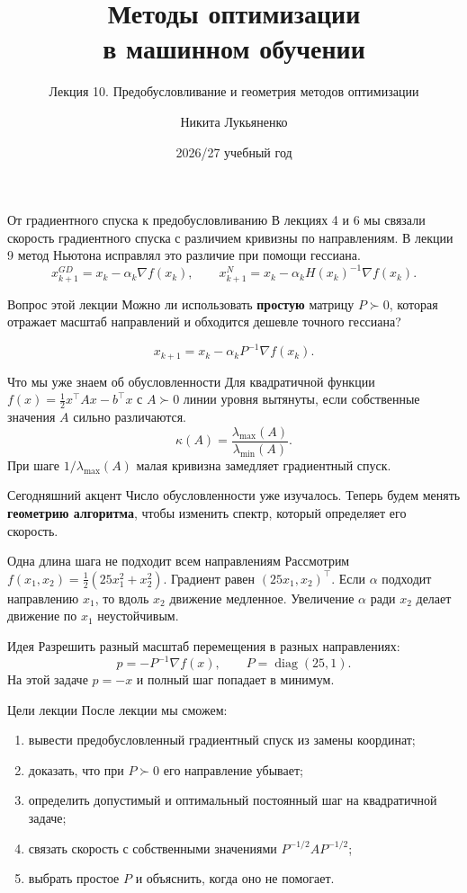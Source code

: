 \documentclass[aspectratio=169,10pt]{beamer}
\title[Методы оптимизации]{Методы оптимизации\\в машинном обучении}
\subtitle{Лекция 10. Предобусловливание и геометрия методов оптимизации}
\author[Н. Лукьяненко]{Никита Лукьяненко}
\institute{Совместная программа СМОЛ ГУ и ФКН НИУ ВШЭ}
\date{2026/27 учебный год}
\newcommand{\grad}{\nabla}
\begin{document}
\frame[plain]{\titlepage}

\begin{frame}{От градиентного спуска к предобусловливанию}
\small
В лекциях 4 и 6 мы связали скорость градиентного спуска с различием кривизны по направлениям. В лекции 9 метод Ньютона исправлял это различие при помощи гессиана.
\[
x_{k+1}^{GD}=x_k-\alpha_k\grad f(x_k),\qquad
x_{k+1}^{N}=x_k-\alpha_k H(x_k)^{-1}\grad f(x_k).
\]
\begin{block}{Вопрос этой лекции}
Можно ли использовать \textbf{простую} матрицу $P\succ0$, которая отражает масштаб направлений и обходится дешевле точного гессиана?
\end{block}
\[
\boxed{x_{k+1}=x_k-\alpha_kP^{-1}\grad f(x_k).}
\]
\end{frame}

\begin{frame}{Что мы уже знаем об обусловленности}
\small
Для квадратичной функции $f(x)=\tfrac12x^\top Ax-b^\top x$ с $A\succ0$ линии уровня вытянуты, если собственные значения $A$ сильно различаются.
\[
\kappa(A)=\frac{\lambda_{\max}(A)}{\lambda_{\min}(A)}.
\]
При шаге $1/\lambda_{\max}(A)$ малая кривизна замедляет градиентный спуск.
\begin{alertblock}{Сегодняшний акцент}
Число обусловленности уже изучалось. Теперь будем менять \textbf{геометрию алгоритма}, чтобы изменить спектр, который определяет его скорость.
\end{alertblock}
\end{frame}

\begin{frame}{Одна длина шага не подходит всем направлениям}
\small
Рассмотрим $f(x_1,x_2)=\tfrac12(25x_1^2+x_2^2)$. Градиент равен $(25x_1,x_2)^\top$.
Если $\alpha$ подходит направлению $x_1$, то вдоль $x_2$ движение медленное. Увеличение $\alpha$ ради $x_2$ делает движение по $x_1$ неустойчивым.
\begin{block}{Идея}
Разрешить разный масштаб перемещения в разных направлениях:
\[
p=-P^{-1}\grad f(x),\qquad P=\operatorname{diag}(25,1).
\]
На этой задаче $p=-x$ и полный шаг попадает в минимум.
\end{block}
\end{frame}

\begin{frame}{Цели лекции}
\small
После лекции мы сможем:
\begin{enumerate}
\item вывести предобусловленный градиентный спуск из замены координат;
\item доказать, что при $P\succ0$ его направление убывает;
\item определить допустимый и оптимальный постоянный шаг на квадратичной задаче;
\item связать скорость с собственными значениями $P^{-1/2}AP^{-1/2}$;
\item выбрать простое $P$ и объяснить, когда оно не помогает.
\end{enumerate}
\end{frame}
\end{document}

